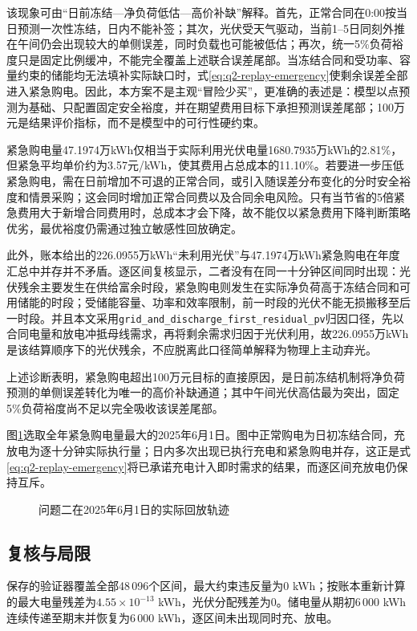 该现象可由“日前冻结---净负荷低估---高价补缺”解释。首先，正常合同在0:00按当日预测一次性冻结，日内不能补签；其次，光伏受天气驱动，当前1--5日同刻外推在午间仍会出现较大的单侧误差，同时负载也可能被低估；再次，统一5\%负荷裕度只是固定比例缓冲，不能完全覆盖上述联合误差尾部。当冻结合同和受功率、容量约束的储能均无法填补实际缺口时，式\eqref{eq:q2-replay-emergency}使剩余误差全部进入紧急购电。因此，本方案不是主观“冒险少买”，更准确的表述是：模型以点预测为基础、只配置固定安全裕度，并在期望费用目标下承担预测误差尾部；100万元是结果评价指标，而不是模型中的可行性硬约束。

紧急购电量47.1974万kWh仅相当于实际利用光伏电量1680.7935万kWh的2.81\%，但紧急平均单价约为3.57元/kWh，使其费用占总成本的11.10\%。若要进一步压低紧急购电，需在日前增加不可退的正常合同，或引入随误差分布变化的分时安全裕度和情景采购；这会同时增加正常合同费以及合同余电风险。只有当节省的5倍紧急费用大于新增合同费用时，总成本才会下降，故不能仅以紧急费用下降判断策略优劣，最优裕度仍需通过独立敏感性回放确定。

此外，账本给出的226.0955万kWh“未利用光伏”与47.1974万kWh紧急购电在年度汇总中并存并不矛盾。逐区间复核显示，二者没有在同一十分钟区间同时出现：光伏残余主要发生在供给富余时段，紧急购电则发生在实际净负荷高于冻结合同和可用储能的时段；受储能容量、功率和效率限制，前一时段的光伏不能无损搬移至后一时段。并且本文采用\texttt{grid\_and\_discharge\_first\_residual\_pv}归因口径，先以合同电量和放电冲抵母线需求，再将剩余需求归因于光伏利用，故226.0955万kWh是该结算顺序下的光伏残余，不应脱离此口径简单解释为物理上主动弃光。

上述诊断表明，紧急购电超出100万元目标的直接原因，是日前冻结机制将净负荷预测的单侧误差转化为唯一的高价补缺通道；其中午间光伏高估最为突出，固定5\%负荷裕度尚不足以完全吸收该误差尾部。

图\ref{fig:q2-day}选取全年紧急购电量最大的2025年6月1日。图中正常购电为日初冻结合同，充放电为逐十分钟实际执行量；日内多次出现已执行充电和紧急购电并存，这正是式\eqref{eq:q2-replay-emergency}将已承诺充电计入即时需求的结果，而逐区间充放电仍保持互斥。

\begin{figure}[H]
  \centering
  \caption{问题二在2025年6月1日的实际回放轨迹}
  \label{fig:q2-day}
\end{figure}

\subsection{复核与局限}
保存的验证器覆盖全部48\,096个区间，最大约束违反量为0 kWh；按账本重新计算的最大电量残差为$4.55\times10^{-13}$ kWh，光伏分配残差为0。储电量从期初6\,000 kWh连续传递至期末并恢复为6\,000 kWh，逐区间未出现同时充、放电。

